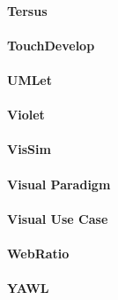 \paragraph{Tersus}

\paragraph{TouchDevelop}

\paragraph{UMLet}

\paragraph{Violet}

\paragraph{VisSim}

\paragraph{Visual Paradigm}

\paragraph{Visual Use Case}

\paragraph{WebRatio}

\paragraph{YAWL}


